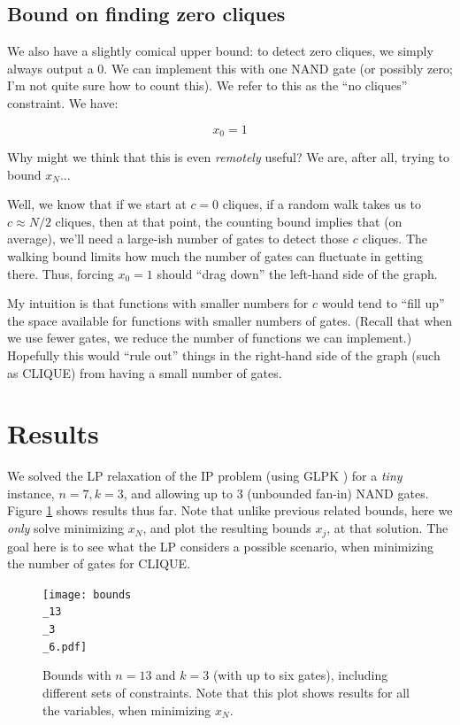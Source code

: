 \documentclass[12pt]{article}
\theoremstyle{definition}
\begin{document}
\subsection{Bound on finding zero cliques}

We also have a slightly comical upper bound:
to detect zero cliques, we simply always
output a 0. We can implement this with one NAND gate (or possibly zero;
I'm not quite sure how to count this). We refer to this as the
``no cliques'' constraint. We have:

\[
x_0 = 1
\]

Why might we think that this is even {\em remotely} useful? We are, after
all, trying to bound $x_N$...

Well, we know that if we start at $c=0$ cliques, if a random walk takes us to
$c \approx N/2$ cliques, then at that point, the counting bound implies that
(on average), we'll need a large-ish number of gates to detect those $c$ cliques.
The walking bound limits how much the number of gates can fluctuate
in getting there. Thus, forcing $x_0=1$ should ``drag down'' the left-hand side of the graph.

My intuition is that functions with smaller numbers for $c$ would
tend to ``fill up'' the space available for functions with smaller numbers of gates.
(Recall that when we use fewer gates, we reduce the number of functions we can implement.)
Hopefully this would ``rule out'' things in the right-hand side of the graph (such as CLIQUE)
from having a small number of gates.

\section{Results}

We solved the LP relaxation of the IP problem (using GLPK \cite{glpk})
for a {\em tiny} instance, $n=7, k=3$, and allowing up to 3 (unbounded fan-in)
NAND gates.
Figure \ref{fig:bounds0} shows results thus far.
Note that unlike previous related bounds, here we {\em only} solve minimizing
$x_N$, and plot the resulting bounds $x_j$, at that solution. The
goal here is to see what the LP considers a possible scenario, when
minimizing the number of gates for CLIQUE.

\begin{figure}

\centering

\texttt{[image: bounds\\\_13\\\_3\\\_6.pdf]}

\caption{ Bounds with $n=13$ and $k=3$ (with up to six gates),
including different sets of constraints.  Note that this plot shows
results for all the variables, when minimizing $x_N$.}
\label{fig:bounds0}

\end{figure}
\end{document}
